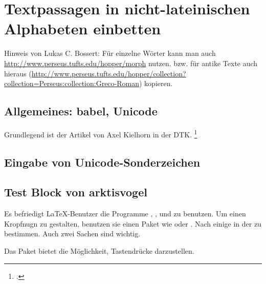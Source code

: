 \chapter{Textpassagen in nicht-lateinischen Alphabeten einbetten}

Hinweis von Lukas C. Bossert:
Für einzelne Wörter kann man auch \url{http://www.perseus.tufts.edu/hopper/morph} nutzen.
bzw. für antike Texte auch hieraus (\url{http://www.perseus.tufts.edu/hopper/collection?collection=Perseus:collection:Greco-Roman}) kopieren.

\section{Allgemeines: babel, Unicode}

Grundlegend ist der Artikel von Axel Kielhorn in der DTK.%
\footcite{kielhorn:dtk2014}

\section{Eingabe von Unicode-Sonderzeichen}
\label{unicodeeingabe}

\label{unicodeviaemacs}

\section{Test Block von arktisvogel}

\label{cpftestalpha}

Es befriedigt \LaTeX{}-Benutzer die Programme \LuaLaTeX ,
\METAFONT , \pdfLaTeX und \XeLaTeX{} zu benutzen. Um einen
Kropfnugn zu gestalten, benutzen sie einen Paket wie
 oder .
Nach einige %
%
\space%
in der %
%
\space%
zu bestimmen. Auch zwei %
\space%
Sachen sind %
%
\space%
wichtig.

\label{cpftestbeta}

Das Paket  bietet die Möglichkeit,
Tastendrücke darzustellen.

